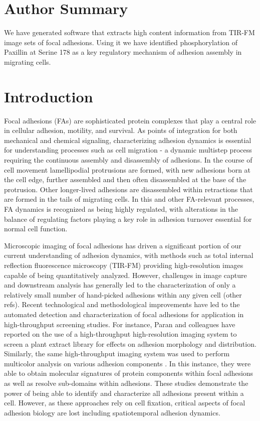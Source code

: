 \documentclass[10pt]{article}
\begin{document}

\section*{Author Summary}

We have generated software that extracts high content information from TIR-FM
image sets of focal adhesions.  Using it we have identified phosphorylation of
Paxillin at Serine 178 as a key regulatory mechanism of adhesion assembly in
migrating cells.

\section*{Introduction}

Focal adhesions (FAs) are sophisticated protein complexes that play a central
role in cellular adhesion, motility, and survival. As points of integration for
both mechanical and chemical signaling, characterizing adhesion dynamics is
essential for understanding processes such as cell migration - a dynamic
multistep process requiring the continuous assembly and disassembly of
adhesions. In the course of cell movement lamellipodial protrusions are formed,
with new adhesions born at the cell edge, further assembled and then often
disassembled at the base of the protrusion. Other longer-lived adhesions are
disassembled within retractions that are formed in the tails of migrating cells.
In this and other FA-relevant processes, FA dynamics is recognized as being
highly regulated, with alterations in the balance of regulating factors playing
a key role in adhesion turnover essential for normal cell function.

Microscopic imaging of focal adhesions has driven a significant portion of our
current understanding of adhesion dynamics, with methods such as total internal
reflection fluorescence microscopy (TIR-FM) providing high-resolution images
capable of being quantitatively analyzed. However, challenges in image capture
and downstream analysis has generally led to the characterization of only a
relatively small number of hand-picked adhesions within any given cell
\cite{Webb2004} (other refs). Recent technological and methodological improvements have led to the automated detection and characterization of focal adhesions for application in high-throughput screening studies. For instance, Paran and colleagues have reported on the use of a high-throughput high-resolution imaging system to screen a plant extract library for effects on adhesion morphology and distribution. Similarly, the same high-throughput imaging system was used to perform multicolor analysis on various adhesion components \cite{Zamir2008}. In this instance, they were able to obtain molecular signatures of protein components within focal adhesions as well as resolve sub-domains within adhesions. These studies demonstrate the power of being able to identify and characterize all adhesions present within a cell. However, as these approaches rely on cell fixation, critical aspects of focal adhesion biology are lost including spatiotemporal adhesion dynamics.
\end{document}
